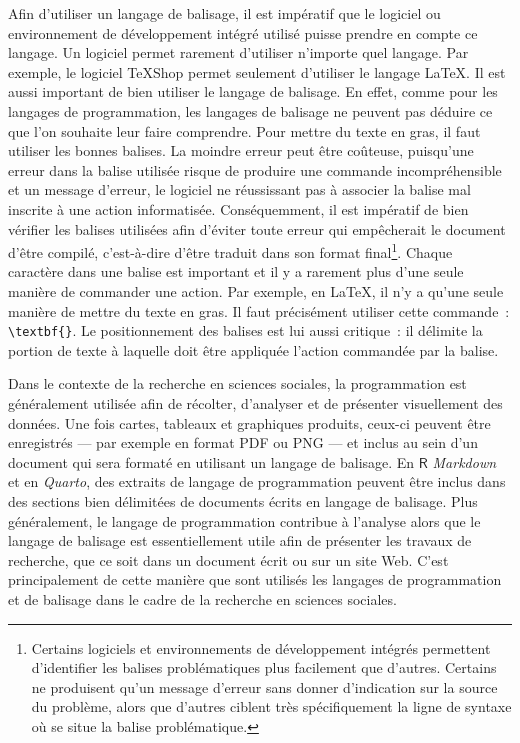 \documentclass[
  letterpaper,
  DIV=11,
  numbers=noendperiod,
  oneside]{scrreprt}
\begin{document}
Afin d'utiliser un langage de balisage, il est impératif que le logiciel
ou environnement de développement intégré utilisé puisse prendre en
compte ce langage. Un logiciel permet rarement d'utiliser n'importe quel
langage. Par exemple, le logiciel \TeX{}Shop permet seulement d'utiliser
le langage \LaTeX{}. Il est aussi important de bien utiliser le langage
de balisage. En effet, comme pour les langages de programmation, les
langages de balisage ne peuvent pas déduire ce que l'on souhaite leur
faire comprendre. Pour mettre du texte en gras, il faut utiliser les
bonnes balises. La moindre erreur peut être coûteuse, puisqu'une erreur
dans la balise utilisée risque de produire une commande incompréhensible
et un message d'erreur, le logiciel ne réussissant pas à associer la
balise mal inscrite à une action informatisée. Conséquemment, il est
impératif de bien vérifier les balises utilisées afin d'éviter toute
erreur qui empêcherait le document d'être compilé, c'est-à-dire d'être
traduit dans son format final\footnote{Certains logiciels et
  environnements de développement intégrés permettent d'identifier les
  balises problématiques plus facilement que d'autres. Certains ne
  produisent qu'un message d'erreur sans donner d'indication sur la
  source du problème, alors que d'autres ciblent très spécifiquement la
  ligne de syntaxe où se situe la balise problématique.}. Chaque
caractère dans une balise est important et il y a rarement plus d'une
seule manière de commander une action. Par exemple, en \LaTeX{}, il n'y
a qu'une seule manière de mettre du texte en gras. Il faut précisément
utiliser cette commande~: \texttt{\textbackslash{}textbf\{\}}. Le
positionnement des balises est lui aussi critique~: il délimite la
portion de texte à laquelle doit être appliquée l'action commandée par
la balise.

Dans le contexte de la recherche en sciences sociales, la programmation
est généralement utilisée afin de récolter, d'analyser et de présenter
visuellement des données. Une fois cartes, tableaux et graphiques
produits, ceux-ci peuvent être enregistrés --- par exemple en format PDF
ou PNG --- et inclus au sein d'un document qui sera formaté en utilisant
un langage de balisage. En \(\textsf{R}\) \emph{Markdown} et en
\emph{Quarto}, des extraits de langage de programmation peuvent être
inclus dans des sections bien délimitées de documents écrits en langage
de balisage. Plus généralement, le langage de programmation contribue à
l'analyse alors que le langage de balisage est essentiellement utile
afin de présenter les travaux de recherche, que ce soit dans un document
écrit ou sur un site Web. C'est principalement de cette manière que sont
utilisés les langages de programmation et de balisage dans le cadre de
la recherche en sciences sociales.
\end{document}
